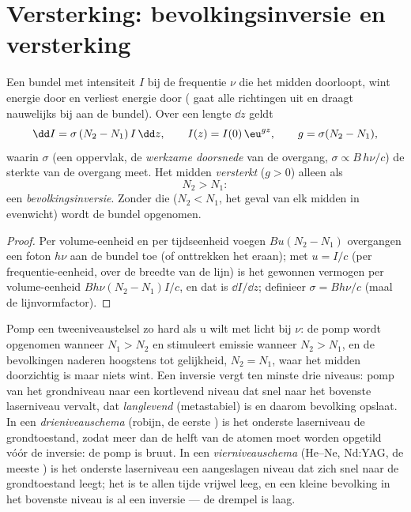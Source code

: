 \section{Versterking: bevolkingsinversie en versterking}

\begin{proposition}\label{prop:b2:laser:gain}
Een bundel met intensiteit $I$ bij de frequentie $\nu$ die het midden doorloopt,
wint energie door  en verliest energie door 
( gaat alle richtingen uit en draagt nauwelijks bij aan
de bundel). Over een lengte $\dd z$ geldt
\[
\dd I = \sigma\,(N_2 - N_1)\,I\,\dd z, \qquad
I(z) = I(0)\,\eu^{g z}, \qquad g = \sigma(N_2 - N_1),
\]
waarin $\sigma$ (een oppervlak, de \emph{werkzame doorsnede} van de overgang, $\sigma \propto B\,h\nu/c$) de
sterkte van de overgang meet. Het midden \emph{versterkt} ($g > 0$)
alleen als
\[
N_2 > N_1 :
\]
een \emph{bevolkingsinversie}. Zonder die
($N_2 < N_1$, het geval van elk midden in evenwicht) wordt de bundel
opgenomen.
\end{proposition}

\begin{proof}
Per volume-eenheid en per tijdseenheid voegen $B u (N_2 - N_1)$ overgangen
een foton $h\nu$ aan de bundel toe (of onttrekken het eraan); met $u = I/c$
(per frequentie-eenheid, over
de breedte van de lijn) is het gewonnen vermogen per volume-eenheid
$B h\nu (N_2 - N_1) I/c$, en dat is $\dd I/\dd z$; definieer
$\sigma =
Bh\nu/c$ (maal de lijnvormfactor).
\end{proof}

\begin{remark}\label{rem:b2:laser:twolevel}
Pomp een tweeniveaustelsel zo hard als u wilt met licht bij $\nu$: de
pomp wordt opgenomen wanneer $N_1 > N_2$ en stimuleert emissie wanneer $N_2 > N_1$,
en de bevolkingen naderen hoogstens tot gelijkheid, $N_2 = N_1$, waar het
midden doorzichtig is maar niets wint. Een inversie vergt ten minste
drie niveaus: pomp van het grondniveau naar een kortlevend niveau dat
snel naar het bovenste laserniveau vervalt, dat \emph{langlevend}
(metastabiel) is en daarom bevolking opslaat. In een
\emph{drieniveauschema} (robijn, de eerste
) is het onderste laserniveau de grondtoestand, zodat meer dan de helft
van de atomen moet worden opgetild vóór de inversie: de pomp is bruut. In een
\emph{vierniveauschema} (He--Ne, Nd:YAG, de meeste
) is het onderste laserniveau een aangeslagen niveau dat zich snel
naar de grondtoestand leegt; het is te allen tijde vrijwel leeg, en een kleine
bevolking in het bovenste niveau is al een inversie --- de drempel
is laag.
\end{remark}

